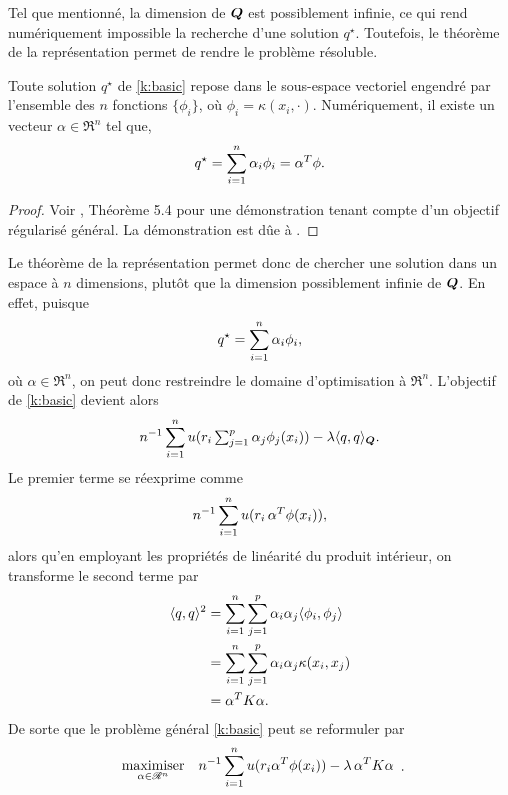 Tel que mentionné, la dimension de $\Q$ est possiblement infinie, ce qui rend
numériquement impossible la recherche d'une solution $q^\star$. Toutefois, le théorème de la
représentation permet de rendre le problème résoluble. 

\begin{thm}
  \label{k:thmrep}
  Toute solution $q^\star$ de \eqref{k:basic} repose dans le sous-espace vectoriel engendré
  par l'ensemble des $n$ fonctions $\{\phi_i\}$, où $\phi_i = \kappa(x_i,\cdot)$. Numériquement, il
  existe un vecteur $\alpha \in \Re^n$ tel que,
  \begin{equation}
    q^\star = \sumi \alpha_i \phi_i = \alpha^T\phi.
  \end{equation}
\end{thm}
\begin{proof}
  Voir \cite{mohri2012foundations}, Théorème 5.4 pour une démonstration tenant compte d'un
  objectif régularisé général. La démonstration est dûe à \cite{kimeldorf1971some}.
\end{proof}

Le théorème de la représentation permet donc de chercher une solution dans un espace à $n$
dimensions, plutôt que la dimension possiblement infinie de $\Q$. En effet, puisque
\begin{equation}
  q^\star = \sumi \alpha_i \phi_i,
\end{equation}
où $\alpha \in \Re^n$, on peut donc restreindre le domaine d'optimisation à $\Re^n$. L'objectif de
\eqref{k:basic} devient alors
\begin{equation}
  n^{-1}\sumi u(r_i \textstyle \sumj \alpha_j \phi_j(x_i)) - \lambda \langle q,q \rangle_{\Q}. 
\end{equation}
Le premier terme se réexprime comme
\begin{equation}
  n^{-1} \sumi u(r_i\,\alpha^T\phi(x_i)),
\end{equation}
alors qu'en employant les propriétés de linéarité du produit intérieur, on transforme le
second terme par
\begin{align}
  \inp{q,q}^2 &= \sumi \sumj \alpha_i \alpha_j \inp{\phi_i,\phi_j}\\
                 &= \sumi \sumj \alpha_i \alpha_j \kappa(x_i,x_j)\\
                 &= \alpha^T K \alpha.
\end{align}
De sorte que le problème général \eqref{k:basic} peut se reformuler par
\begin{equation}
  \maximizeEquation[\alpha \in \Re^n]{n^{-1}\sumi u(r_i \alpha^T \phi(x_i)) - \lambda\,\alpha^TK\alpha}.
\end{equation}


